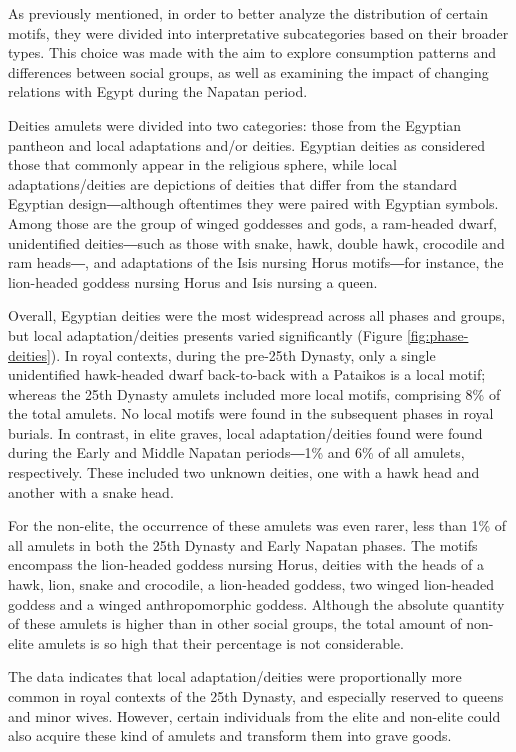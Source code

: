 As previously mentioned, in order to better analyze the distribution of certain motifs, they were divided into interpretative subcategories based on their broader types. This choice was made with the aim to explore consumption patterns and differences between social groups, as well as examining the impact of changing relations with Egypt during the Napatan period.


Deities amulets were divided into two categories: those from the Egyptian pantheon and local adaptations and/or deities. Egyptian deities as considered those that commonly appear in the religious sphere, while local adaptations/deities are depictions of deities that differ from the standard Egyptian design―although oftentimes they were paired with Egyptian symbols. Among those are the group of winged goddesses and gods, a ram-headed dwarf, unidentified deities―such as those with snake, hawk, double hawk, crocodile and ram heads―, and adaptations of the Isis nursing Horus motifs―for instance, the lion-headed goddess nursing Horus and Isis nursing a queen.

Overall, Egyptian deities were the most widespread across all phases and groups, but local adaptation/deities presents varied significantly (Figure \ref{fig:phase-deities}). In royal contexts, during the pre-25th Dynasty, only a single unidentified hawk-headed dwarf back-to-back with a Pataikos is a local motif; whereas the 25th Dynasty amulets included more local motifs, comprising 8\% of the total amulets. No local motifs were found in the subsequent phases in royal burials. In contrast, in elite graves, local adaptation/deities found were found during the Early and Middle Napatan periods―1\% and 6\% of all amulets, respectively. These included two unknown deities, one with a hawk head and another with a snake head.


For the non-elite, the occurrence of these amulets was even rarer, less than 1\% of all amulets in both the 25th Dynasty and Early Napatan phases. The motifs encompass the lion-headed goddess nursing Horus, deities with the heads of a hawk, lion, snake and crocodile, a lion-headed goddess, two winged lion-headed goddess and a winged anthropomorphic goddess. Although the absolute quantity of these amulets is higher than in other social groups, the total amount of non-elite amulets is so high that their percentage is not considerable.


The data indicates that local adaptation/deities were proportionally more common in royal contexts of the 25th Dynasty, and especially reserved to queens and minor wives. However, certain individuals from the elite and non-elite could also acquire these kind of amulets and transform them into grave goods.

